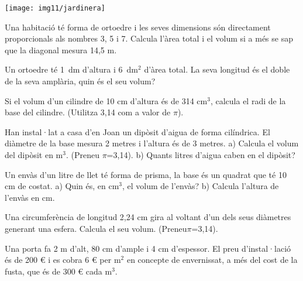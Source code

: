 \begin{activitats}
\begin{mylist}
\begin{center}
\texttt{[image: img11/jardinera]}
\end{center}


\exer  Una habitació té forma de ortoedre i les seves dimensions són directament proporcionals als nombres 3, 5 i 7. Calcula l'àrea total i el volum si a més se sap que la diagonal mesura 14,5 m.


\exer  Un ortoedre té 1~dm d'altura i 6~dm${}^{2}$ d'àrea total. La seva longitud és el doble de la seva amplària, quin és el seu volum?


\exer  Si el volum d'un cilindre de 10 cm d'altura és de 314 cm${}^{3}$, calcula el radi de la base del cilindre. (Utilitza 3,14 com a valor de $\pi$).

 
\exer  Han instal·lat a casa d'en Joan un dipòsit d'aigua de forma cilíndrica. El diàmetre de la base mesura 2 metres i l'altura és de 3 metres. a) Calcula el volum del dipòsit en m${}^{ 3}$. (Preneu $\pi$=3,14). b) Quants litres d'aigua caben en el dipòsit?

\answers[cols=1]{[$V=3\pi=9.4247$ m$^3$, $9424.8$ litres]}

\exer  Un envàs d'un litre de llet té forma de prisma, la base és un quadrat que té 10 cm de costat. a) Quin és, en cm${}^{3}$, el volum de l'envàs? b) Calcula l'altura de l'envàs en cm.

\answers[cols=1]{[$1$ l = $1000$ cm$^3$, l'altura és 10 cm (és un cub)]}

\exer  Una circumferència de longitud 2,24 cm gira al voltant d'un dels seus diàmetres generant una esfera. Calcula el seu volum. (Preneu$\pi$=3,14).


\exer  Una porta fa 2 m d'alt, 80 cm d'ample i 4 cm d'espessor. El preu d'instal·lació és de 200 \euro{} i es cobra 6 \euro{} per m${}^{2}$ en concepte de envernissat, a més del cost de la fusta, que és de 300 \euro{} cada m${}^{ 3}$.


\end{mylist}
\end{activitats}
